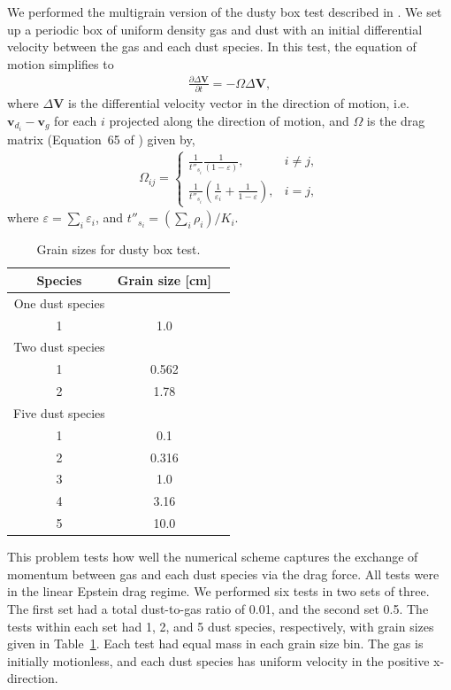 \documentclass[fleqn,usenatbib]{mnras}
\let\vec\mathbf
\begin{document}
We performed the multigrain version of the dusty box test described in
\citet{Laibe2011MNRAS.418.1491L}. We set up a periodic box of uniform density
gas and dust with an initial differential velocity between the gas and each dust
species. In this test, the equation of motion simplifies to
%
\begin{align}
   \frac{\partial \Delta \vec{V}}{\partial t} = - \Omega \Delta \vec{V},
\end{align}
%
where \(\Delta \vec{V}\) is the differential velocity vector in the direction of
motion, i.e. \(\vec{v}_{d_i} - \vec{v}_g\) for each \(i\) projected along the
direction of motion, and \(\Omega\) is the drag matrix (Equation~65 of
\citet{Laibe2014MNRAS.444.1940L}) given by,
%
\begin{align}
   \Omega_{ij} =
   \begin{cases}
      \frac{1}{t''_{s_i}} \frac{1}{(1 - \varepsilon)}, &i \neq j,\\
      \frac{1}{t''_{s_i}} \left( \frac{1}{\varepsilon_i} +
         \frac{1}{1 - \varepsilon} \right), &i = j,
   \end{cases}
\end{align}
%
where \( \varepsilon = \sum_i \varepsilon_i \), and \( t''_{s_i} = \left( \sum_i
\rho_i \right) / K_i \).

\begin{table}
   \centering
   \begin{tabular}{ccc}
      \hline
      \hline
      Species & Grain size [cm] \\
      \hline
      \hline
      One dust species \\
      1 & 1.0 \\
      \hline
      Two dust species \\
      1 & 0.562 \\
      2 & 1.78 \\
      \hline
      Five dust species \\
      1 & 0.1 \\
      2 & 0.316 \\
      3 & 1.0 \\
      4 & 3.16 \\
      5 & 10.0 \\
      \hline
      \hline
   \end{tabular}
   \caption{Grain sizes for dusty box test.}%
   \label{tab:box}
\end{table}

This problem tests how well the numerical scheme captures the exchange of
momentum between gas and each dust species via the drag force. All tests were in
the linear Epstein drag regime. We performed six tests in two sets of three. The
first set had a total dust-to-gas ratio of 0.01, and the second set 0.5. The
tests within each set had 1, 2, and 5 dust species, respectively, with grain
sizes given in Table~\ref{tab:box}. Each test had equal mass in each grain size
bin. The gas is initially motionless, and each dust species has uniform velocity
in the positive x-direction.
\end{document}
